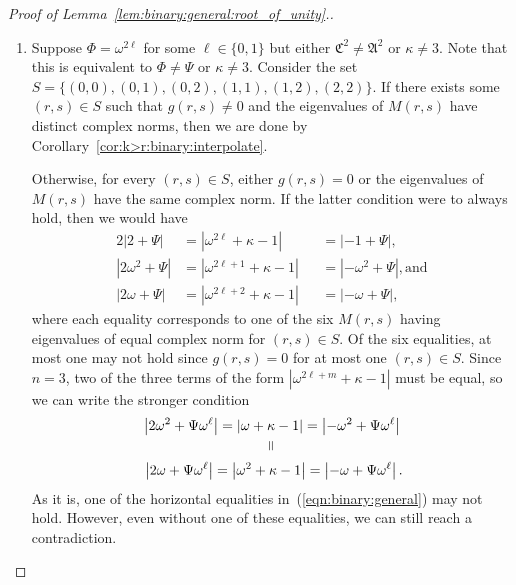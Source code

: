 \documentclass[11pt]{article}
\begin{document}
\begin{proof}[Proof of Lemma~\ref{lem:binary:general:root_of_unity}.]
\begin{enumerate}
  \item Suppose $\Phi = \omega^{2 \ell}$ for some $\ell \in \{0,1\}$ but either $\mathfrak{C}^2 \ne \mathfrak{A}^2$ or $\kappa \ne 3$.
  Note that this is equivalent to $\Phi \ne \Psi$ or $\kappa \ne 3$.
  Consider the set $S = \{(0,0), (0,1), (0,2), (1,1), (1,2), (2,2)\}$.
  If there exists some $(r,s) \in S$ such that $g(r,s) \ne 0$ and the eigenvalues of $M(r, s)$ have distinct complex norms,
  then we are done by Corollary~\ref{cor:k>r:binary:interpolate}.
 
  Otherwise, for every $(r,s) \in S$,
  either $g(r,s) = 0$ or the eigenvalues of $M(r,s)$ have the same complex norm.
  If the latter condition were to always hold,
  then we would have
  \begin{alignat*}{2}
   \left|2          + \Psi\right| &= \left|\omega^{2 \ell}     + \kappa - 1\right| &&= \left|{-}1        + \Psi\right|,\\
   \left|2 \omega^2 + \Psi\right| &= \left|\omega^{2 \ell + 1} + \kappa - 1\right| &&= \left|{-}\omega^2 + \Psi\right|, \text{and}\\
   \left|2 \omega   + \Psi\right| &= \left|\omega^{2 \ell + 2} + \kappa - 1\right| &&= \left|{-}\omega   + \Psi\right|,
  \end{alignat*}
  where each equality corresponds to one of the six $M(r,s)$ having eigenvalues of equal complex norm for $(r,s) \in S$.
  Of the six equalities,
  at most one may not hold since $g(r,s) = 0$ for at most one $(r,s) \in S$.
  Since $n = 3$,
  two of the three terms of the form $|\omega^{2 \ell + m} + \kappa - 1|$ must be equal,
  so we can write the stronger condition
  \begin{gather}
   \left|2 \omega^2 + \Psi \omega^\ell\right| = \left|\omega   + \kappa - 1\right| = \left|{-}\omega^2 + \Psi \omega^\ell\right| \notag\\
                            \rotatebox{90}{=} \label{eqn:binary:general}\\
   \left|2 \omega   + \Psi \omega^\ell\right| = \left|\omega^2 + \kappa - 1\right| = \left|{-}\omega   + \Psi \omega^\ell\right|\rlap{.} \notag
  \end{gather}
  As it is, one of the horizontal equalities in~(\ref{eqn:binary:general}) may not hold.
  However, even without one of these equalities, we can still reach a contradiction.
  

\end{enumerate}
\end{proof}
\end{document}
